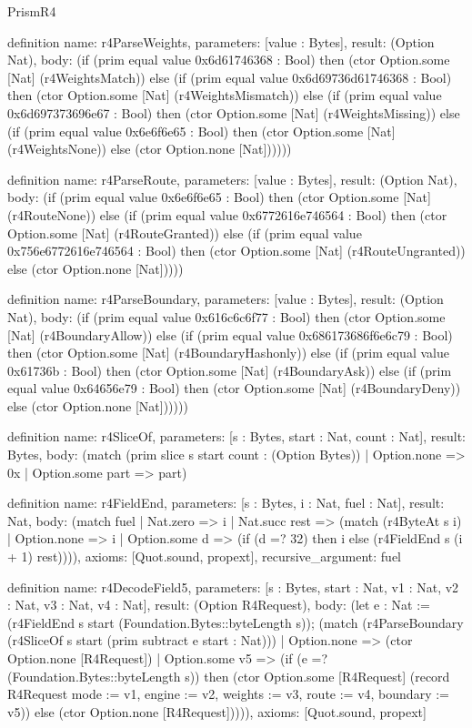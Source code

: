 \begin{lexlean}{PrismR4}
\begin{semanticmodule}
definition{
  name: r4ParseWeights,
  parameters: [value : Bytes],
  result: (Option Nat),
  body: (if (prim equal value 0x6d61746368 : Bool) then (ctor Option.some [Nat] (r4WeightsMatch)) else (if (prim equal value 0x6d69736d61746368 : Bool) then (ctor Option.some [Nat] (r4WeightsMismatch)) else (if (prim equal value 0x6d697373696e67 : Bool) then (ctor Option.some [Nat] (r4WeightsMissing)) else (if (prim equal value 0x6e6f6e65 : Bool) then (ctor Option.some [Nat] (r4WeightsNone)) else (ctor Option.none [Nat])))))
}

definition{
  name: r4ParseRoute,
  parameters: [value : Bytes],
  result: (Option Nat),
  body: (if (prim equal value 0x6e6f6e65 : Bool) then (ctor Option.some [Nat] (r4RouteNone)) else (if (prim equal value 0x6772616e746564 : Bool) then (ctor Option.some [Nat] (r4RouteGranted)) else (if (prim equal value 0x756e6772616e746564 : Bool) then (ctor Option.some [Nat] (r4RouteUngranted)) else (ctor Option.none [Nat]))))
}

definition{
  name: r4ParseBoundary,
  parameters: [value : Bytes],
  result: (Option Nat),
  body: (if (prim equal value 0x616c6c6f77 : Bool) then (ctor Option.some [Nat] (r4BoundaryAllow)) else (if (prim equal value 0x686173686f6e6c79 : Bool) then (ctor Option.some [Nat] (r4BoundaryHashonly)) else (if (prim equal value 0x61736b : Bool) then (ctor Option.some [Nat] (r4BoundaryAsk)) else (if (prim equal value 0x64656e79 : Bool) then (ctor Option.some [Nat] (r4BoundaryDeny)) else (ctor Option.none [Nat])))))
}

definition{
  name: r4SliceOf,
  parameters: [s : Bytes, start : Nat, count : Nat],
  result: Bytes,
  body: (match (prim slice s start count : (Option Bytes))
    | Option.none => 0x
    | Option.some part => part)
}

definition{
  name: r4FieldEnd,
  parameters: [s : Bytes, i : Nat, fuel : Nat],
  result: Nat,
  body: (match fuel
    | Nat.zero => i
    | Nat.succ rest => (match (r4ByteAt s i)
      | Option.none => i
      | Option.some d => (if (d =? 32) then i else (r4FieldEnd s (i + 1) rest)))),
  axioms: [Quot.sound, propext],
  recursive_argument: fuel
}

definition{
  name: r4DecodeField5,
  parameters: [s : Bytes, start : Nat, v1 : Nat, v2 : Nat, v3 : Nat, v4 : Nat],
  result: (Option R4Request),
  body: (let e : Nat := (r4FieldEnd s start (Foundation.Bytes::byteLength s)); (match (r4ParseBoundary (r4SliceOf s start (prim subtract e start : Nat)))
    | Option.none => (ctor Option.none [R4Request])
    | Option.some v5 => (if (e =? (Foundation.Bytes::byteLength s)) then (ctor Option.some [R4Request] (record R4Request {mode := v1, engine := v2, weights := v3, route := v4, boundary := v5})) else (ctor Option.none [R4Request])))),
  axioms: [Quot.sound, propext]
}


\end{semanticmodule}
\end{lexlean}
